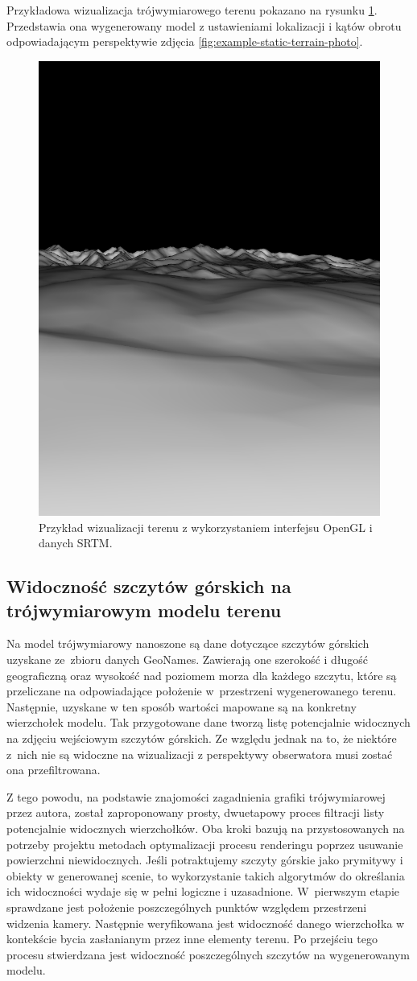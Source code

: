 Przykładowa wizualizacja trójwymiarowego terenu pokazano na rysunku \ref{fig:rendered}. Przedstawia ona wygenerowany model z ustawieniami lokalizacji i kątów obrotu odpowiadającym perspektywie zdjęcia \ref{fig:example-static-terrain-photo}. 

\begin{figure}[!h]
    \centering \includegraphics[width=0.45\linewidth]{img/rendered_scene.png}
    \caption{Przykład wizualizacji terenu z wykorzystaniem interfejsu OpenGL i danych SRTM.}
    \label{fig:rendered}
\end{figure}


\subsection{Widoczność szczytów górskich na trójwymiarowym modelu terenu} \label{sec:widocznosc_model}

Na model trójwymiarowy nanoszone są dane dotyczące szczytów górskich uzyskane ze~zbioru danych GeoNames. Zawierają one szerokość i długość geograficzną oraz wysokość nad poziomem morza dla każdego szczytu, które są przeliczane na odpowiadające położenie w~przestrzeni wygenerowanego terenu. Następnie, uzyskane w ten sposób wartości mapowane są na konkretny wierzchołek modelu. Tak przygotowane dane tworzą listę potencjalnie widocznych na zdjęciu wejściowym szczytów górskich. Ze względu jednak na to, że niektóre z~nich nie są widoczne na wizualizacji z perspektywy obserwatora musi zostać ona przefiltrowana.

Z tego powodu, na podstawie znajomości zagadnienia grafiki trójwymiarowej przez autora, został zaproponowany prosty, dwuetapowy proces filtracji listy potencjalnie widocznych wierzchołków. Oba kroki bazują na przystosowanych na potrzeby projektu metodach optymalizacji procesu renderingu poprzez usuwanie powierzchni niewidocznych. Jeśli potraktujemy szczyty górskie jako prymitywy i obiekty w generowanej scenie, to wykorzystanie takich algorytmów do określania ich widoczności wydaje się w pełni logiczne i uzasadnione. W~pierwszym etapie sprawdzane jest położenie poszczególnych punktów względem przestrzeni widzenia kamery. Następnie weryfikowana jest widoczność danego wierzchołka w kontekście bycia zasłanianym przez inne elementy terenu. Po przejściu tego procesu stwierdzana jest widoczność poszczególnych szczytów na wygenerowanym modelu.

